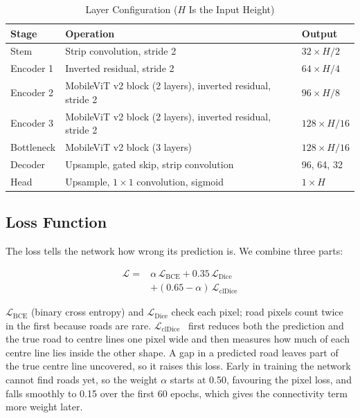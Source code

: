 \documentclass{ieeeaccess}
\begin{document}
\begin{table}[t]
\caption{Layer Configuration ($H$ Is the Input Height)}
\label{tab:layers}
\setlength{\tabcolsep}{2pt}
\tablebodyfont
\begin{tabular}{|p{48pt}|p{120pt}|p{50pt}|}
\hline
Stage & Operation & Output \\
\hline
Stem & Strip convolution, stride 2 & $32 \times H/2$ \\
Encoder 1 & Inverted residual, stride 2 & $64 \times H/4$ \\
Encoder 2 & MobileViT v2 block (2 layers), inverted residual, stride 2 & $96 \times H/8$ \\
Encoder 3 & MobileViT v2 block (2 layers), inverted residual, stride 2 & $128 \times H/16$ \\
Bottleneck & MobileViT v2 block (3 layers) & $128 \times H/16$ \\
Decoder & Upsample, gated skip, strip convolution & 96, 64, 32 \\
Head & Upsample, $1 \times 1$ convolution, sigmoid & $1 \times H$ \\
\hline
\end{tabular}
\end{table}

\subsection{Loss Function}

The loss tells the network how wrong its prediction is. We combine three parts:

\begin{equation}
\begin{split}
\mathcal{L} ={}& \alpha\,\mathcal{L}_{\mathrm{BCE}} + 0.35\,\mathcal{L}_{\mathrm{Dice}}\\
&+ (0.65 - \alpha)\,\mathcal{L}_{\mathrm{clDice}}
\end{split}
\label{eq:loss}
\end{equation}

$\mathcal{L}_{\mathrm{BCE}}$ (binary cross entropy) and $\mathcal{L}_{\mathrm{Dice}}$ check each pixel; road pixels count twice in the first because roads are rare. $\mathcal{L}_{\mathrm{clDice}}$~\cite{shit2021cldice} first reduces both the prediction and the true road to centre lines one pixel wide and then measures how much of each centre line lies inside the other shape. A gap in a predicted road leaves part of the true centre line uncovered, so it raises this loss. Early in training the network cannot find roads yet, so the weight $\alpha$ starts at 0.50, favouring the pixel loss, and falls smoothly to 0.15 over the first 60 epochs, which gives the connectivity term more weight later.
\end{document}
